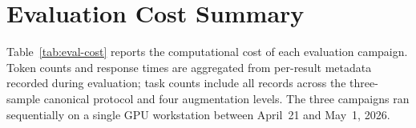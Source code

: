 
%

%


\section{Evaluation Cost Summary}
\label{sec:appendix-j}

Table~\ref{tab:eval-cost} reports the computational cost of each evaluation campaign.
Token counts and response times are aggregated from per-result metadata recorded
during evaluation; task counts include all records across the three-sample
canonical protocol and four augmentation levels.
The three campaigns ran sequentially on a single GPU workstation
between April~21 and May~1, 2026.

